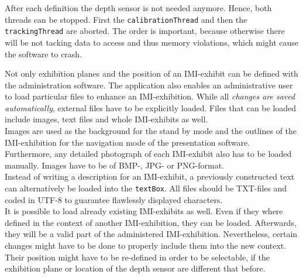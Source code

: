 After each definition the depth sensor is not needed anymore. Hence, both threads can be stopped. First the \texttt{calibrationThread} and then the \texttt{trackingThread} are aborted. The order is important, because otherwise there will be not tacking data to access and thus memory violations, which might cause the software to crash.

Not only exhibition planes and the position of an \ac{IMI}-exhibit can be defined with the administration software. The application also enables an administrative user to load particular files to enhance an \ac{IMI}-exhibition. While all \textit{changes are saved automatically}, external files have to be explicitly loaded. Files that can be loaded include images, text files and whole \ac{IMI}-exhibits as well.
\\
Images are used as the background for the stand by mode and the outlines of the \ac{IMI}-exhibition for the navigation mode of the presentation software. Furthermore, any detailed photograph of each \ac{IMI}-exhibit also has to be loaded manually. Images have to be of BMP-, JPG- or PNG-format.
\\
Instead of writing a description for an \ac{IMI}-exhibit, a previously constructed text can alternatively be loaded into the \texttt{textBox}. All files should be TXT-files and coded in UTF-8 to guarantee flawlessly displayed characters.
\\
It is possible to load already existing \ac{IMI}-exhibits as well. Even if they where defined in the context of another \ac{IMI}-exhibition, they can be loaded. Afterwards, they will be a valid part of the administered \ac{IMI}-exhibition. Nevertheless, certain changes might have to be done to properly include them into the new context. Their position might have to be re-defined in order to be selectable, if the exhibition plane or location of the depth sensor are different that before.

